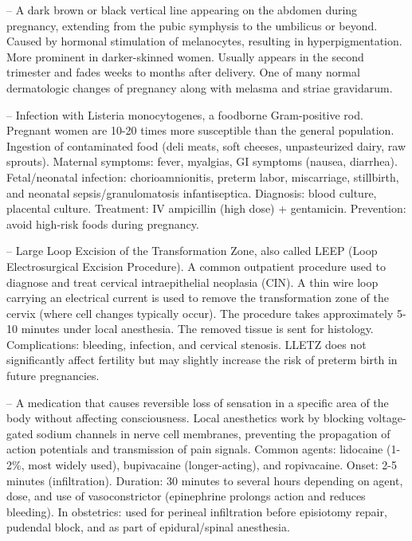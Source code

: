 -- A dark brown or black vertical line appearing on the abdomen during pregnancy, extending from the pubic symphysis to the umbilicus or beyond. Caused by hormonal stimulation of melanocytes, resulting in hyperpigmentation. More prominent in darker-skinned women. Usually appears in the second trimester and fades weeks to months after delivery. One of many normal dermatologic changes of pregnancy along with melasma and striae gravidarum.

-- Infection with Listeria monocytogenes, a foodborne Gram-positive rod. Pregnant women are 10-20 times more susceptible than the general population. Ingestion of contaminated food (deli meats, soft cheeses, unpasteurized dairy, raw sprouts). Maternal symptoms: fever, myalgias, GI symptoms (nausea, diarrhea). Fetal/neonatal infection: chorioamnionitis, preterm labor, miscarriage, stillbirth, and neonatal sepsis/granulomatosis infantiseptica. Diagnosis: blood culture, placental culture. Treatment: IV ampicillin (high dose) + gentamicin. Prevention: avoid high-risk foods during pregnancy.

-- Large Loop Excision of the Transformation Zone, also called LEEP (Loop Electrosurgical Excision Procedure). A common outpatient procedure used to diagnose and treat cervical intraepithelial neoplasia (CIN). A thin wire loop carrying an electrical current is used to remove the transformation zone of the cervix (where cell changes typically occur). The procedure takes approximately 5-10 minutes under local anesthesia. The removed tissue is sent for histology. Complications: bleeding, infection, and cervical stenosis. LLETZ does not significantly affect fertility but may slightly increase the risk of preterm birth in future pregnancies.

-- A medication that causes reversible loss of sensation in a specific area of the body without affecting consciousness. Local anesthetics work by blocking voltage-gated sodium channels in nerve cell membranes, preventing the propagation of action potentials and transmission of pain signals. Common agents: lidocaine (1-2\%, most widely used), bupivacaine (longer-acting), and ropivacaine. Onset: 2-5 minutes (infiltration). Duration: 30 minutes to several hours depending on agent, dose, and use of vasoconstrictor (epinephrine prolongs action and reduces bleeding). In obstetrics: used for perineal infiltration before episiotomy repair, pudendal block, and as part of epidural/spinal anesthesia.


